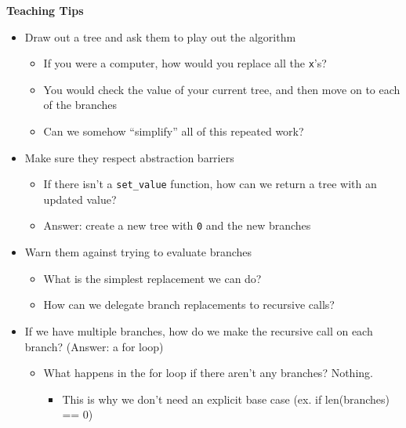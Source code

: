 \documentclass{exam}
\begin{document}
\begin{guide}
	\begin{blocksection}
	\textbf{Teaching Tips}
	\begin{itemize}
			\item Draw out a tree and ask them to play out the algorithm
			\begin{itemize}
	                \item If you were a computer, how would you replace all the \lstinline{x}'s?
	                \item You would check the value of your current tree, and then move on to each of the branches
	                \item Can we somehow “simplify” all of this repeated work?
            \end{itemize}
		\item Make sure they respect abstraction barriers 
            \begin{itemize}
                \item If there isn't a \lstinline{set_value} function, how can we return a tree with an updated value?
                \item Answer: create a new tree with \lstinline{0} and the new branches
            \end{itemize}
		\item Warn them against trying to evaluate branches
            \begin{itemize}
                \item What is the simplest replacement we can do?
                \item How can we delegate branch replacements to recursive calls?
            \end{itemize}
            \item If we have multiple branches, how do we make the recursive call on each branch? (Answer: a for loop)
            \begin{itemize}
                \item What happens in the for loop if there aren’t any branches? Nothing.
                \begin{itemize}
                    \item This is why we don’t need an explicit base case (ex. if len(branches) == 0)
                \end{itemize}
            \end{itemize}
	\end{itemize}
	\end{blocksection}
\end{guide}
\end{document}

